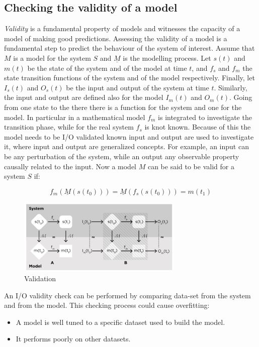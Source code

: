   \subsection{Checking the validity of a model}
  \emph{Validity} is a fundamental property of models and witnesses the capacity of a model of making good predictions.
  Assessing the validity of a model is a fundamental step to predict the behaviour of the system of interest.
  Assume that $M$ is a model for the system $S$ and $\underline{M}$ is the modelling process.
  Let $s(t)$ and $m(t)$ be the state of the system and of the model at time $t$, and $f_s$ and $f_m$ the state transition functions of the system and of the model respectively.
  Finally, let $I_s(t)$ and $O_s(t)$ be the input and output of the system at time $t$.
  Similarly, the input and output are defined also for the model $I_m(t)$ and $O_m(t)$.
  Going from one state to the there there is a function for the system and one for the model.
  In particular in a mathematical model $f_m$ is integrated to investigate the transition phase, while for the real system $f_s$ is knot known.
  Because of this the model needs to be I/O validated known input and output are used to investigate it, where input and output are generalized concepts.
  For example, an input can be any perturbation of the system, while an output any observable property causally related to the input.
  Now a model $M$ can be said to be valid for a system $S$ if:

  $$f_m(\underline{M}(s(t_0))) = \underline{M}(f_s(s(t_0))) = m(t_1)$$

  \begin{figure}[H]
    \centering
    \includegraphics[width=0.7\textwidth]{validation.png}
    \caption{Validation}
    \end{figure}
  \noindent

  An I/O validity check can be performed by comparing data-set from the system and from the model.
  This checking process could cause overfitting:

  \begin{multicols}{2}
    \begin{itemize}
      \item A model is well tuned to a specific dataset used to build the model.
      \item It performs poorly on other datasets.
    \end{itemize}
  \end{multicols}

